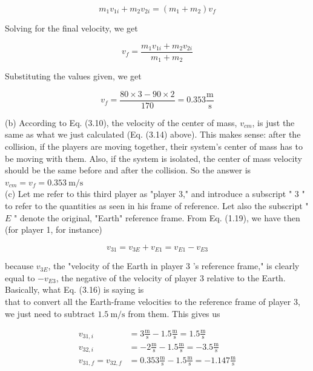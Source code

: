 \documentclass[10pt]{article}
\begin{document}
\begin{equation*}
m_{1} v_{1 i}+m_{2} v_{2 i}=\left(m_{1}+m_{2}\right) v_{f} \tag{3.13}
\end{equation*}


Solving for the final velocity, we get


\begin{equation*}
v_{f}=\frac{m_{1} v_{1 i}+m_{2} v_{2 i}}{m_{1}+m_{2}} \tag{3.14}
\end{equation*}


Substituting the values given, we get


\begin{equation*}
v_{f}=\frac{80 \times 3-90 \times 2}{170}=0.353 \frac{\mathrm{m}}{\mathrm{s}} \tag{3.15}
\end{equation*}


(b) According to Eq. (3.10), the velocity of the center of mass, $v_{c m}$, is just the same as what we just calculated (Eq. (3.14) above). This makes sense: after the collision, if the players are moving together, their system's center of mass has to be moving with them. Also, if the system is isolated, the center of mass velocity should be the same before and after the collision. So the answer is $v_{c m}=v_{f}=0.353 \mathrm{~m} / \mathrm{s}$\\
(c) Let me refer to this third player as "player 3," and introduce a subscript " 3 " to refer to the quantities as seen in his frame of reference. Let also the subscript " $E$ " denote the original, "Earth" reference frame. From Eq. (1.19), we have then (for player 1, for instance)


\begin{equation*}
v_{31}=v_{3 E}+v_{E 1}=v_{E 1}-v_{E 3} \tag{3.16}
\end{equation*}


because $v_{3 E}$, the "velocity of the Earth in player 3 's reference frame," is clearly equal to $-v_{E 3}$, the negative of the velocity of player 3 relative to the Earth. Basically, what Eq. (3.16) is saying is\\
that to convert all the Earth-frame velocities to the reference frame of player 3, we just need to subtract $1.5 \mathrm{~m} / \mathrm{s}$ from them. This gives us


\begin{align*}
v_{31, i} & =3 \frac{\mathrm{m}}{\mathrm{s}}-1.5 \frac{\mathrm{m}}{\mathrm{s}}=1.5 \frac{\mathrm{m}}{\mathrm{s}} \\
v_{32, i} & =-2 \frac{\mathrm{m}}{\mathrm{s}}-1.5 \frac{\mathrm{m}}{\mathrm{s}}=-3.5 \frac{\mathrm{m}}{\mathrm{s}} \\
v_{31, f}=v_{32, f} & =0.353 \frac{\mathrm{m}}{\mathrm{s}}-1.5 \frac{\mathrm{m}}{\mathrm{s}}=-1.147 \frac{\mathrm{m}}{\mathrm{s}} \tag{3.17}
\end{align*}
\end{document}

